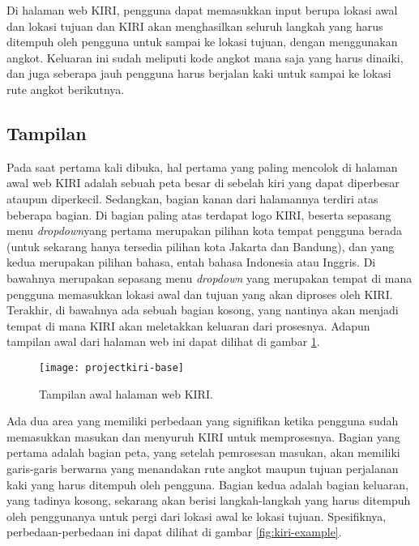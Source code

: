 Di halaman web KIRI, pengguna dapat memasukkan input berupa lokasi awal dan lokasi tujuan dan KIRI akan menghasilkan seluruh langkah yang harus ditempuh oleh pengguna untuk sampai ke lokasi tujuan, dengan menggunakan angkot. Keluaran ini sudah meliputi kode angkot mana saja yang harus dinaiki, dan juga seberapa jauh pengguna harus berjalan kaki untuk sampai ke lokasi rute angkot berikutnya.

\subsection{Tampilan}
\label{sec:kiri-appearance}

Pada saat pertama kali dibuka, hal pertama yang paling mencolok di halaman awal web KIRI adalah sebuah peta besar di sebelah kiri yang dapat diperbesar ataupun diperkecil. Sedangkan, bagian kanan dari halamannya terdiri atas beberapa bagian. Di bagian paling atas terdapat logo KIRI, beserta sepasang menu \textit{dropdown}\textemdash yang pertama merupakan pilihan kota tempat pengguna berada (untuk sekarang hanya tersedia pilihan kota Jakarta dan Bandung), dan yang kedua merupakan pilihan bahasa, entah bahasa Indonesia atau Inggris. Di bawahnya merupakan sepasang menu \textit{dropdown} yang merupakan tempat di mana pengguna memasukkan lokasi awal dan tujuan yang akan diproses oleh KIRI. Terakhir, di bawahnya ada sebuah bagian kosong, yang nantinya akan menjadi tempat di mana KIRI akan meletakkan keluaran dari prosesnya. Adapun tampilan awal dari halaman web ini dapat dilihat di gambar \ref{fig:kiri-base}.

\begin{figure}[ht]
    \centering
    \texttt{[image: projectkiri-base]}
    \caption[Tampilan awal halaman web KIRI]{Tampilan awal halaman web KIRI.}
    \label{fig:kiri-base}
\end{figure}

Ada dua area yang memiliki perbedaan yang signifikan ketika pengguna sudah memasukkan masukan dan menyuruh KIRI untuk memprosesnya. Bagian yang pertama adalah bagian peta, yang setelah pemrosesan masukan, akan memiliki garis-garis berwarna yang menandakan rute angkot maupun tujuan perjalanan kaki yang harus ditempuh oleh pengguna. Bagian kedua adalah bagian keluaran, yang tadinya kosong, sekarang akan berisi langkah-langkah yang harus ditempuh oleh penggunanya untuk pergi dari lokasi awal ke lokasi tujuan. Spesifiknya, perbedaan-perbedaan ini dapat dilihat di gambar \ref{fig:kiri-example}.

